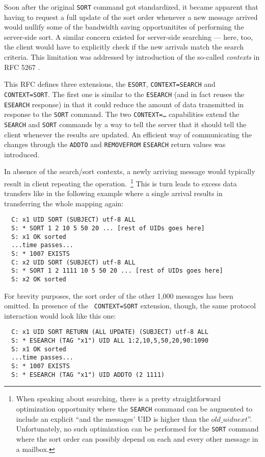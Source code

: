 \documentclass[trojita]{subfiles}
\begin{document}
Soon after the original {\tt SORT} command got standardized, it became apparent that having to request a full update of
the sort order whenever a new message arrived would nullify some of the bandwidth saving opportunitites of performing
the server-side sort.  A similar concern existed for server-side searching --- here, too, the client would have to
explicitly check if the new arrivals match the search criteria.  This limitation was addressed by introduction of the
so-called {\em contexts} in RFC 5267 \cite{rfc5267}.

This RFC defines three extensions, the {\tt ESORT}, {\tt CONTEXT=SEARCH} and {\tt CONTEXT=SORT}.  The first one is
similar to the {\tt ESEARCH} (and in fact reuses the {\tt ESEARCH} response) in that it could reduce the amount of data
transmitted in response to the {\tt SORT} command.  The two {\tt CONTEXT=\ldots} capabilities extend the {\tt SEARCH}
and {\tt SORT} commands by a way to tell the server that it should tell the client whenever the results are updated.  An
efficient way of communicating the changes through the {\tt ADDTO} and {\tt REMOVEFROM} {\tt ESEARCH} return values was
introduced.

In absence of the search/sort contexts, a newly arriving message would typically result in client repeating the
operation.~\footnote{When speaking about searching, there is a pretty straightforward optimization opportunity where the
{\tt SEARCH} command can be augmented to include an explicit ``and the messages' UID is higher than the
$old\_uidnext$''.  Unfortunately, no such optimization can be performed for the {\tt SORT} command where the sort order
can possibly depend on each and every other message in a mailbox.}  This is turn leads to excess data transfers like in
the following example where a single arrival results in transferring the whole mapping again:

\begin{verbatim}
  C: x1 UID SORT (SUBJECT) utf-8 ALL
  S: * SORT 1 2 10 5 50 20 ... [rest of UIDs goes here]
  S: x1 OK sorted
  ...time passes...
  S: * 1007 EXISTS
  C: x2 UID SORT (SUBJECT) utf-8 ALL
  S: * SORT 1 2 1111 10 5 50 20 ... [rest of UIDs goes here]
  S: x2 OK sorted
\end{verbatim}

For brevity purposes, the sort order of the other 1,000 messages has been omitted.  In presence of the {\tt
CONTEXT=SORT} extension, though, the same protocol interaction would look like this one:

\begin{verbatim}
  C: x1 UID SORT RETURN (ALL UPDATE) (SUBJECT) utf-8 ALL
  S: * ESEARCH (TAG "x1") UID ALL 1:2,10,5,50,20,90:1090
  S: x1 OK sorted
  ...time passes...
  S: * 1007 EXISTS
  S: * ESEARCH (TAG "x1") UID ADDTO (2 1111)
\end{verbatim}
\end{document}
